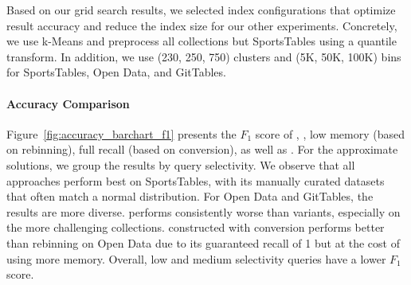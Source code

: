 Based on our grid search results, we selected index configurations that optimize result accuracy and reduce the index size for our other experiments.
Concretely, we use k-Means and preprocess all collections but SportsTables using a quantile transform.
In addition, we use (230, 250, 750) clusters and (5K, 50K, 100K) bins for SportsTables, Open Data, and GitTables.

\paragraph{Accuracy Comparison}
Figure~\ref{fig:accuracy_barchart_f1} presents the $F_1$ score of \pscan, \ndist, \approximate{} low memory (based on rebinning), \approximate{} full recall (based on conversion), as well as \exact{}.
For the approximate solutions, we group the results by query selectivity.
We observe that all approaches perform best on SportsTables, with its manually curated datasets that often match a normal distribution.
For Open Data and GitTables, the results are more diverse.
\ndist performs consistently worse than \approximate{} variants, especially on the more challenging collections.
\approximate{} constructed with conversion performs better than rebinning on Open Data due to its guaranteed recall of 1 but at the cost of using more memory.
Overall, low and medium selectivity queries have a lower $F_1$ score.

